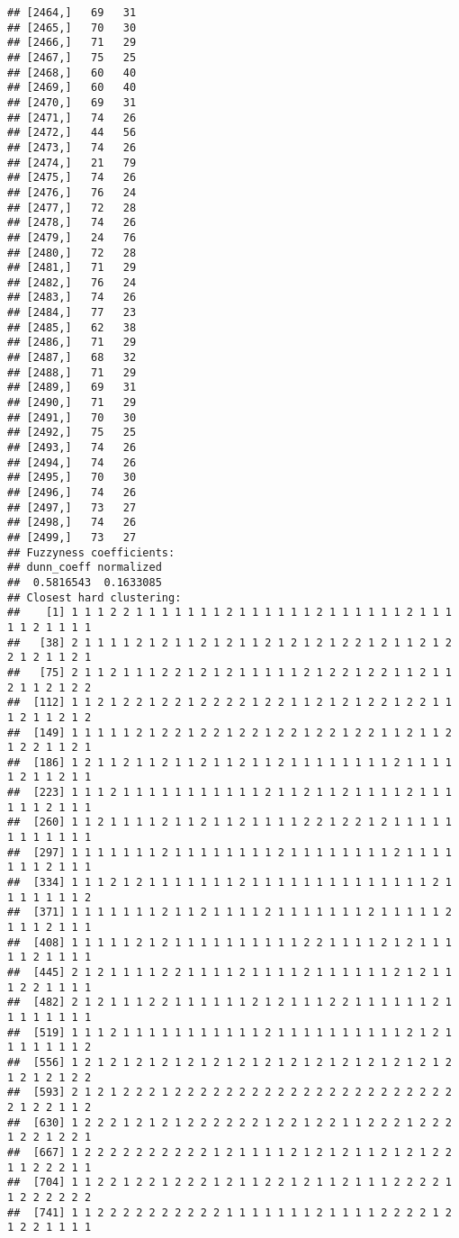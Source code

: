 \documentclass[
]{article}
\begin{document}
\begin{verbatim}
## [2464,]   69   31
## [2465,]   70   30
## [2466,]   71   29
## [2467,]   75   25
## [2468,]   60   40
## [2469,]   60   40
## [2470,]   69   31
## [2471,]   74   26
## [2472,]   44   56
## [2473,]   74   26
## [2474,]   21   79
## [2475,]   74   26
## [2476,]   76   24
## [2477,]   72   28
## [2478,]   74   26
## [2479,]   24   76
## [2480,]   72   28
## [2481,]   71   29
## [2482,]   76   24
## [2483,]   74   26
## [2484,]   77   23
## [2485,]   62   38
## [2486,]   71   29
## [2487,]   68   32
## [2488,]   71   29
## [2489,]   69   31
## [2490,]   71   29
## [2491,]   70   30
## [2492,]   75   25
## [2493,]   74   26
## [2494,]   74   26
## [2495,]   70   30
## [2496,]   74   26
## [2497,]   73   27
## [2498,]   74   26
## [2499,]   73   27
## Fuzzyness coefficients:
## dunn_coeff normalized 
##  0.5816543  0.1633085 
## Closest hard clustering:
##    [1] 1 1 1 2 2 1 1 1 1 1 1 1 2 1 1 1 1 1 1 2 1 1 1 1 1 1 2 1 1 1 1 1 2 1 1 1 1
##   [38] 2 1 1 1 1 2 1 2 1 1 2 1 2 1 1 2 1 2 1 2 1 2 2 1 2 1 1 2 1 2 2 1 2 1 1 2 1
##   [75] 2 1 1 2 1 1 1 2 2 1 2 1 2 1 1 1 1 1 2 1 2 2 1 2 2 1 1 2 1 1 2 1 1 2 1 2 2
##  [112] 1 1 2 1 2 2 1 2 2 1 2 2 2 2 1 2 2 1 1 2 1 2 1 2 2 1 2 2 1 1 1 2 1 1 2 1 2
##  [149] 1 1 1 1 1 2 1 2 2 1 2 2 1 2 2 1 2 2 1 2 2 1 2 2 1 1 2 1 1 2 1 2 2 1 1 2 1
##  [186] 1 2 1 1 2 1 1 2 1 1 2 1 1 2 1 1 2 1 1 1 1 1 1 1 1 2 1 1 1 1 1 2 1 1 2 1 1
##  [223] 1 1 1 2 1 1 1 1 1 1 1 1 1 1 1 2 1 1 2 1 1 2 1 1 1 1 2 1 1 1 1 1 1 2 1 1 1
##  [260] 1 1 2 1 1 1 1 2 1 1 2 1 1 2 1 1 1 1 2 2 1 2 2 1 2 1 1 1 1 1 1 1 1 1 1 1 1
##  [297] 1 1 1 1 1 1 1 2 1 1 1 1 1 1 1 1 2 1 1 1 1 1 1 1 1 2 1 1 1 1 1 1 1 2 1 1 1
##  [334] 1 1 1 2 1 2 1 1 1 1 1 1 1 2 1 1 1 1 1 1 1 1 1 1 1 1 1 1 2 1 1 1 1 1 1 1 2
##  [371] 1 1 1 1 1 1 1 2 1 1 2 1 1 1 1 2 1 1 1 1 1 1 1 2 1 1 1 1 1 2 1 1 1 2 1 1 1
##  [408] 1 1 1 1 1 2 1 2 1 1 1 1 1 1 1 1 1 1 2 2 1 1 1 1 2 1 2 1 1 1 1 1 2 1 1 1 1
##  [445] 2 1 2 1 1 1 1 2 2 1 1 1 1 2 1 1 1 1 2 1 1 1 1 1 1 2 1 2 1 1 1 2 2 1 1 1 1
##  [482] 2 1 2 1 1 1 2 2 1 1 1 1 1 1 2 1 2 1 1 1 2 2 1 1 1 1 1 1 2 1 1 1 1 1 1 1 1
##  [519] 1 1 1 2 1 1 1 1 1 1 1 1 1 1 1 2 1 1 1 1 1 1 1 1 1 1 2 1 2 1 1 1 1 1 1 1 2
##  [556] 1 2 1 2 1 2 1 2 1 2 1 2 1 2 1 2 1 2 1 2 1 2 1 2 1 2 1 2 1 2 1 2 1 2 1 2 2
##  [593] 2 1 2 1 2 2 2 1 2 2 2 2 2 2 2 2 2 2 2 2 2 2 2 2 2 2 2 2 2 2 2 1 2 2 1 1 2
##  [630] 1 2 2 2 1 2 1 2 1 2 2 2 2 2 2 1 2 2 1 2 2 1 1 2 2 2 1 2 2 2 1 2 2 1 2 2 1
##  [667] 1 2 2 2 2 2 2 2 2 2 2 1 2 1 1 1 1 2 1 2 1 2 1 1 2 1 2 1 2 2 1 1 2 2 2 1 1
##  [704] 1 1 2 2 1 2 2 1 2 2 2 1 2 1 1 2 2 1 2 1 1 2 1 1 1 2 2 2 2 1 1 2 2 2 2 2 2
##  [741] 1 1 2 2 2 2 2 2 2 2 2 2 1 1 1 1 1 1 1 2 1 1 1 1 2 2 2 2 1 2 1 2 2 1 1 1 1

\end{verbatim}
\end{document}
